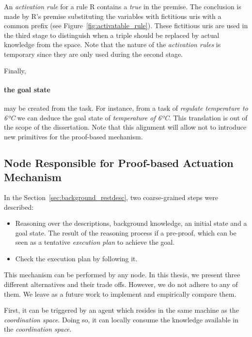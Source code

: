 An \emph{activation rule} for a rule R contains a \emph{true} in the premise.
The conclusion is made by R's premise substituting the variables with fictitious \acsp{uri} with a common prefix (see Figure~\ref{fig:activatable_rule}).
These fictitious \acsp{uri} are used in the third stage to distinguish when a triple should be replaced by actual knowledge from the space. %
Note that the nature of the \emph{activation rules} is temporary since they are only used during the second stage.



Finally, \paragraph{the goal state} may be created from the task.
For instance, from a task of \emph{regulate temperature to 6ºC} we can deduce the goal state of \emph{temperature of 6ºC}.
This translation is out of the scope of the dissertation.
Note that this alignment will allow not to introduce new primitives for the proof-based mechanism.



\subsection{Node Responsible for Proof-based Actuation Mechanism}
\label{sec:responsible_proof}

In the Section~\ref{sec:background_restdesc}, two coarse-grained steps were described:
\begin{itemize}
  \item Reasoning over the descriptions, background knowledge, an initial state and a goal state.
        The result of the reasoning process if a pre-proof, which can be seen as a tentative \emph{execution plan} to achieve the goal.
  \item Check the execution plan by following it.
\end{itemize}


This mechanism can be performed by any node.
In this thesis, we present three different alternatives and their trade offs.
However, we do not adhere to any of them.
We leave as a future work to implement and empirically compare them.


First, it can be triggered by an agent which resides in the same machine as the \emph{coordination space}.
Doing so, it can locally consume the knowledge available in the \emph{coordination space}.



